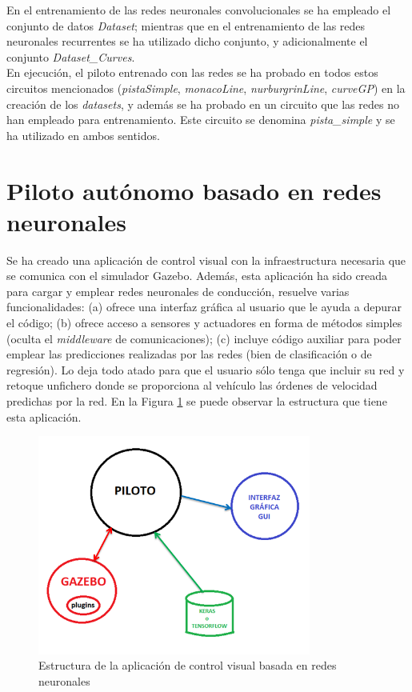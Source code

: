 En el entrenamiento de las redes neuronales convolucionales se ha empleado el conjunto de datos \textit{Dataset}; mientras que en el entrenamiento de las redes neuronales recurrentes se ha utilizado dicho conjunto, y adicionalmente el conjunto \textit{Dataset\_Curves}.\\

En ejecución, el piloto entrenado con las redes se ha probado en todos estos circuitos mencionados (\textit{pistaSimple}, \textit{monacoLine}, \textit{nurburgrinLine}, \textit{curveGP}) en la creación de los \textit{datasets}, y además se ha probado en un circuito que las redes no han empleado para entrenamiento. Este circuito se denomina \textit{pista\_simple} y se ha utilizado en ambos sentidos.


\section{Piloto autónomo basado en redes neuronales}

Se ha creado una aplicación de control visual con la infraestructura necesaria que se comunica con el simulador Gazebo. Además, esta aplicación ha sido creada para cargar y emplear redes neuronales de conducción, resuelve varias funcionalidades: (a) ofrece una interfaz gráfica al usuario que le ayuda a depurar el código; (b) ofrece acceso a sensores y actuadores en forma de métodos simples (oculta el \textit{middleware} de comunicaciones); (c) incluye código auxiliar para poder emplear las predicciones realizadas por las redes (bien de clasificación o de regresión). Lo deja todo atado para que el usuario sólo tenga que incluir su red y retoque unfichero donde se proporciona al vehículo las órdenes de velocidad predichas por la red. En la Figura \ref{fig.nodo_piloto} se puede observar la estructura que tiene esta aplicación.\\

\begin{figure}
  \begin{center}
    \includegraphics[width=0.8\textwidth]{figures/Infraestructura/nodo_piloto.png}
		\caption{Estructura de la aplicación de control visual basada en redes neuronales}
		\label{fig.nodo_piloto}
		\end{center}
\end{figure}


